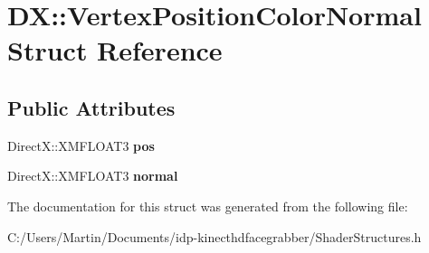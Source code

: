 \hypertarget{struct_d_x_1_1_vertex_position_color_normal}{}\section{D\+X\+:\+:Vertex\+Position\+Color\+Normal Struct Reference}
\label{struct_d_x_1_1_vertex_position_color_normal}
\subsection*{Public Attributes}
\begin{DoxyCompactItemize}
\item 
\hypertarget{struct_d_x_1_1_vertex_position_color_normal_aa474603e43b3f6d242a2286256ba91d8}{}Direct\+X\+::\+X\+M\+F\+L\+O\+A\+T3 {\bfseries pos}\label{struct_d_x_1_1_vertex_position_color_normal_aa474603e43b3f6d242a2286256ba91d8}

\item 
\hypertarget{struct_d_x_1_1_vertex_position_color_normal_a275ea9a4550657a4af1699c09131c736}{}Direct\+X\+::\+X\+M\+F\+L\+O\+A\+T3 {\bfseries normal}\label{struct_d_x_1_1_vertex_position_color_normal_a275ea9a4550657a4af1699c09131c736}

\end{DoxyCompactItemize}


The documentation for this struct was generated from the following file\+:\begin{DoxyCompactItemize}
\item 
C\+:/\+Users/\+Martin/\+Documents/idp-\/kinecthdfacegrabber/Shader\+Structures.\+h\end{DoxyCompactItemize}
